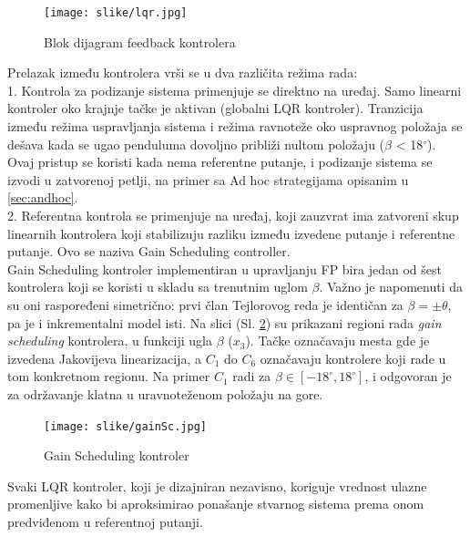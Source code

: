 \documentclass[a4paper,11pt]{article}
\theoremstyle{definition} \newtheorem{deff}{Definicija}[section]
\theoremstyle{definition} \newtheorem{prim}[deff]{Primer}
\theoremstyle{plain} \newtheorem{teor}[deff]{Teorema}
\begin{document}
	\begin{figure}[!h]
		\centering
		\texttt{[image: slike/lqr.jpg]}
		\caption{Blok dijagram feedback kontrolera \cite{inicijalna}}
		\label{fig:lqr}
	\end{figure}
	
	
	
	Prelazak između kontrolera vrši se u dva različita režima rada: \\
	
	1. Kontrola za podizanje sistema primenjuje se direktno na uređaj. Samo linearni kontroler oko krajnje tačke je aktivan (globalni LQR kontroler). Tranzicija između režima uspravljanja sistema i režima ravnoteže oko uspravnog položaja se dešava kada se ugao penduluma dovoljno približi nultom položaju ($\beta$ < 18$^\circ$). Ovaj pristup se koristi kada nema referentne putanje, i podizanje sistema se izvodi u zatvorenoj petlji, na primer sa Ad hoc strategijama opisanim u \ref{sec:andhoc}. \\
	
	2. Referentna kontrola se primenjuje na uređaj, koji zauzvrat ima zatvoreni skup linearnih kontrolera koji stabilizuju razliku između izvedene putanje i referentne putanje. Ovo se naziva Gain Scheduling controller.\\
	
	Gain Scheduling kontroler implementiran u upravljanju FP bira jedan od šest kontrolera koji se koristi u skladu sa trenutnim uglom $\beta$. Važno je napomenuti da su oni raspoređeni simetrično: prvi član Tejlorovog reda je identičan za $\beta = \pm \theta$, pa je i inkrementalni model isti. 
	Na slici (Sl. \ref{fig:ganSc}) su prikazani regioni rada \emph{gain scheduling} kontrolera, u funkciji ugla $\beta$ ($x_3$). Tačke označavaju mesta gde je izvedena Jakovijeva linearizacija, a $C_1$ do $C_6$ označavaju kontrolere koji rade u tom konkretnom regionu. Na primer $C_1$ radi za $\beta \in [-18^\circ, 18^\circ]$, i odgovoran je za održavanje klatna u uravnoteženom položaju na gore.
	
	\begin{figure}[!h]
		\centering
		\texttt{[image: slike/gainSc.jpg]}
		\caption{Gain Scheduling kontroler \cite{inicijalna}}
		\label{fig:ganSc}
	\end{figure}
	
	Svaki LQR kontroler, koji je dizajniran nezavisno, koriguje vrednost ulazne promenljive kako bi aproksimirao ponašanje stvarnog sistema prema onom predviđenom u referentnoj putanji.\\
	
\end{document}
